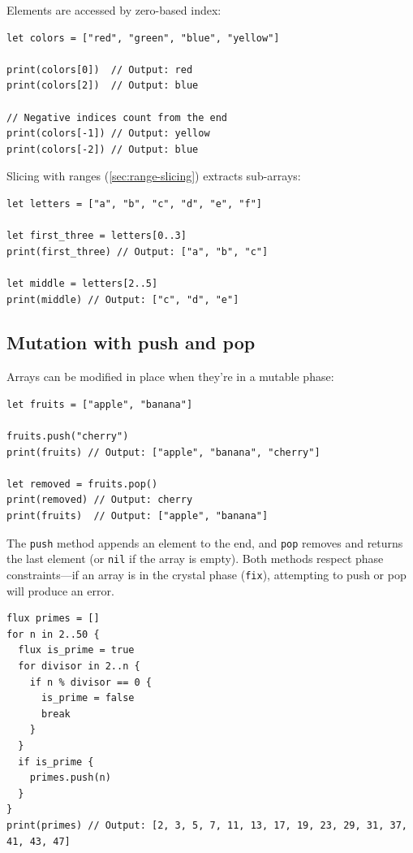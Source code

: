 Elements are accessed by zero-based index:

\begin{lstlisting}[language=Lattice, caption={Array indexing}]
let colors = ["red", "green", "blue", "yellow"]

print(colors[0])  // Output: red
print(colors[2])  // Output: blue

// Negative indices count from the end
print(colors[-1]) // Output: yellow
print(colors[-2]) // Output: blue
\end{lstlisting}

Slicing with ranges (\cref{sec:range-slicing}) extracts sub-arrays:

\begin{lstlisting}[language=Lattice, caption={Array slicing}]
let letters = ["a", "b", "c", "d", "e", "f"]

let first_three = letters[0..3]
print(first_three) // Output: ["a", "b", "c"]

let middle = letters[2..5]
print(middle) // Output: ["c", "d", "e"]
\end{lstlisting}

\subsection{Mutation with push and pop}\label{sec:push-pop}

Arrays can be modified in place when they're in a mutable phase:

\begin{lstlisting}[language=Lattice, caption={push and pop}]
let fruits = ["apple", "banana"]

fruits.push("cherry")
print(fruits) // Output: ["apple", "banana", "cherry"]

let removed = fruits.pop()
print(removed) // Output: cherry
print(fruits)  // Output: ["apple", "banana"]
\end{lstlisting}

The \lstinline|push| method appends an element to the end, and \lstinline|pop| removes and returns the last element (or \lstinline|nil| if the array is empty). Both methods respect phase constraints---if an array is in the crystal phase (\lstinline|fix|), attempting to push or pop will produce an error.

\begin{lstlisting}[language=Lattice, caption={Building arrays with push}]
flux primes = []
for n in 2..50 {
  flux is_prime = true
  for divisor in 2..n {
    if n % divisor == 0 {
      is_prime = false
      break
    }
  }
  if is_prime {
    primes.push(n)
  }
}
print(primes) // Output: [2, 3, 5, 7, 11, 13, 17, 19, 23, 29, 31, 37, 41, 43, 47]
\end{lstlisting}

